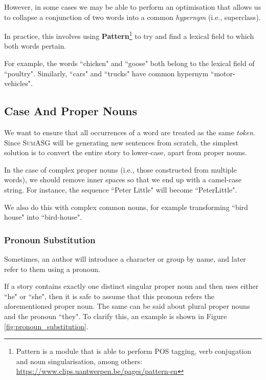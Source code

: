 However, in some cases we may be able to perform an optimisation that allows us to collapse a conjunction of two words into a common \textit{hypernym} (i.e., superclass).

In practice, this involves using \textbf{Pattern}\footnote{Pattern is a module that is able to perform POS tagging, verb conjugation and noun singularisation, among others: \url{https://www.clips.uantwerpen.be/pages/pattern-en}} to try and find a lexical field to which both words pertain.

For example, the words ``chicken" and ``goose" both belong to the lexical field of ``poultry". Similarly, ``cars" and ``trucks" have common hypernym ``motor-vehicles".

\subsection{Case And Proper Nouns}

We want to ensure that all occurrences of a word are treated as the same \textit{token}. Since \textsc{SumASG} will be generating new sentences from scratch, the simplest solution is to convert the entire story to lower-case, apart from proper nouns.

In the case of complex proper nouns (i.e., those constructed from multiple words), we should remove inner spaces so that we end up with a camel-case string. For instance, the sequence ``Peter Little" will become ``PeterLittle".

We also do this with complex common nouns, for example transforming ``bird house" into ``bird-house".

\subsubsection{Pronoun Substitution}

Sometimes, an author will introduce a character or group by name, and later refer to them using a pronoun.

If a story contains exactly one distinct singular proper noun and then uses either ``he" or ``she", then it is safe to assume that this pronoun refers the aforementioned proper noun. The same can be said about plural proper nouns and the pronoun ``they".
To clarify this, an example is shown in Figure \ref{fig:pronoun_substitution}.

